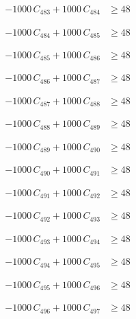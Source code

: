 \documentclass[a4paper,11pt]{article}
\begin{document}
\begin{align}
-1000\,C_{483} + 1000\,C_{484} &\geq 48 \nonumber
\end{align}

\begin{align}
-1000\,C_{484} + 1000\,C_{485} &\geq 48 \nonumber
\end{align}

\begin{align}
-1000\,C_{485} + 1000\,C_{486} &\geq 48 \nonumber
\end{align}

\begin{align}
-1000\,C_{486} + 1000\,C_{487} &\geq 48 \nonumber
\end{align}

\begin{align}
-1000\,C_{487} + 1000\,C_{488} &\geq 48 \nonumber
\end{align}

\begin{align}
-1000\,C_{488} + 1000\,C_{489} &\geq 48 \nonumber
\end{align}

\begin{align}
-1000\,C_{489} + 1000\,C_{490} &\geq 48 \nonumber
\end{align}

\begin{align}
-1000\,C_{490} + 1000\,C_{491} &\geq 48 \nonumber
\end{align}

\begin{align}
-1000\,C_{491} + 1000\,C_{492} &\geq 48 \nonumber
\end{align}

\begin{align}
-1000\,C_{492} + 1000\,C_{493} &\geq 48 \nonumber
\end{align}

\begin{align}
-1000\,C_{493} + 1000\,C_{494} &\geq 48 \nonumber
\end{align}

\begin{align}
-1000\,C_{494} + 1000\,C_{495} &\geq 48 \nonumber
\end{align}

\begin{align}
-1000\,C_{495} + 1000\,C_{496} &\geq 48 \nonumber
\end{align}

\begin{align}
-1000\,C_{496} + 1000\,C_{497} &\geq 48 \nonumber
\end{align}
\end{document}
